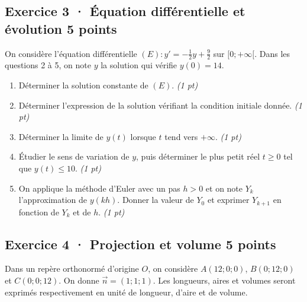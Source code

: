 \clearpage{}\par

\subsection*{Exercice 3 · Équation différentielle et évolution \hfill 5 points}On considère l'équation différentielle $(E):y'=-\frac1{2}y+\frac{9}{2}$ sur $[0;+\infty[$. Dans les questions 2 à 5, on note $y$ la solution qui vérifie $y(0)=14$.

\begin{enumerate}

\item Déterminer la solution constante de $(E)$. \hfill\textit{(1 pt)}

\item Déterminer l'expression de la solution vérifiant la condition initiale donnée. \hfill\textit{(1 pt)}

\item Déterminer la limite de $y(t)$ lorsque $t$ tend vers $+\infty$. \hfill\textit{(1 pt)}

\item Étudier le sens de variation de $y$, puis déterminer le plus petit réel $t\ge0$ tel que $y(t)\le10$. \hfill\textit{(1 pt)}

\item On applique la méthode d'Euler avec un pas $h>0$ et on note $Y_k$ l'approximation de $y(kh)$. Donner la valeur de $Y_0$ et exprimer $Y_{k+1}$ en fonction de $Y_k$ et de $h$. \hfill\textit{(1 pt)}

\end{enumerate}

\subsection*{Exercice 4 · Projection et volume \hfill 5 points}Dans un repère orthonormé d'origine $O$, on considère $A(12;0;0)$, $B(0;12;0)$ et $C(0;0;12)$. On donne $\vec n=(1;1;1)$. Les longueurs, aires et volumes seront exprimés respectivement en unité de longueur, d'aire et de volume.

